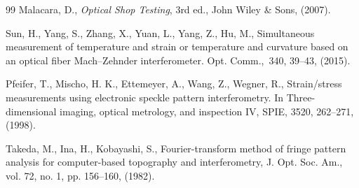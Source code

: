 \documentclass{article}
\begin{document}
\begin{thebibliography}{99}
		 Malacara, D., \emph{Optical Shop Testing}, 3rd ed., John Wiley \& Sons, (2007).

		 Sun, H., Yang, S., Zhang, X., Yuan, L., Yang, Z., Hu, M., Simultaneous measurement of temperature and strain or temperature and curvature based on an optical fiber Mach–Zehnder interferometer. Opt. Comm., 340, 39--43, (2015).
		
		 Pfeifer, T., Mischo, H. K., Ettemeyer, A., Wang, Z., Wegner, R., Strain/stress measurements using electronic speckle pattern interferometry. In Three-dimensional imaging, optical metrology, and inspection IV, SPIE, 3520, 262--271, (1998).
        
         Takeda, M., Ina, H., Kobayashi, S., Fourier-transform method of fringe pattern analysis for computer-based topography and interferometry, J. Opt. Soc. Am., vol. 72, no. 1, pp. 156–160, (1982).
		
	\end{thebibliography}
	
\end{document}
